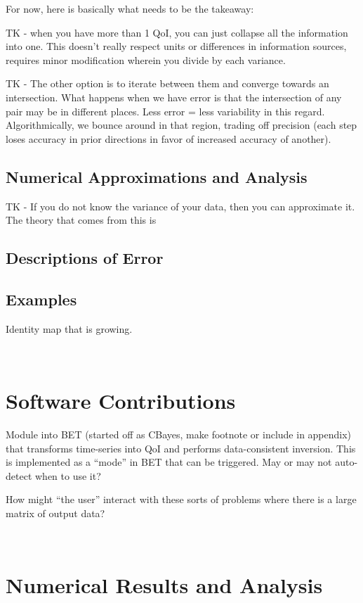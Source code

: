 For now, here is basically what needs to be the takeaway: 

TK - when you have more than 1 QoI, you can just collapse all the information into one. This doesn't really respect units or differences in information sources, requires minor modification wherein you divide by each variance.

TK - The other option is to iterate between them and converge towards an intersection. What happens when we have error is that the intersection of any pair may be in different places. Less error = less variability in this regard. Algorithmically, we bounce around in that region, trading off precision (each step loses accuracy in prior directions in favor of increased accuracy of another). 

\subsection{Numerical Approximations and Analysis}


TK - If you do not know the variance of your data, then you can approximate it. The theory that comes from this is 

\subsection{Descriptions of Error}

\subsection{Examples}

Identity map that is growing. 

\
\section{Software Contributions}

Module into BET (started off as CBayes, make footnote or include in appendix) that transforms time-series into QoI and performs data-consistent inversion.
This is implemented as a ``mode'' in BET that can be triggered. 
May or may not auto-detect when to use it? 

How might ``the user'' interact with these sorts of problems where there is a large matrix of output data?

\
\section{Numerical Results and Analysis}

